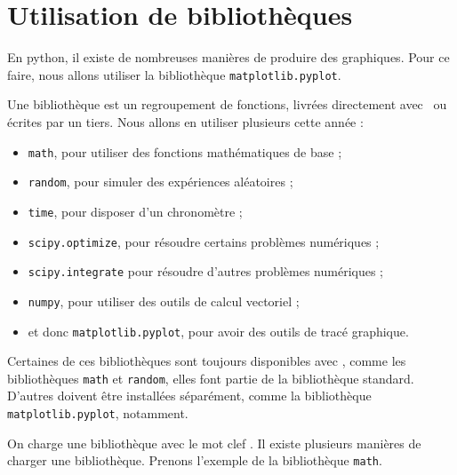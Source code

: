\section{Utilisation de bibliothèques}

En python, il existe de nombreuses manières de produire des graphiques. 
Pour ce faire, nous allons utiliser la bibliothèque \texttt{matplotlib.pyplot}. 

Une bibliothèque est un regroupement de fonctions, livrées directement avec \python\ ou écrites par un tiers.
Nous allons en utiliser plusieurs cette année : 
\begin{itemize}
  \item \texttt{math}, pour utiliser des fonctions mathématiques de base ; 
  \item \texttt{random}, pour simuler des expériences aléatoires ; 
  \item \texttt{time}, pour disposer d'un chronomètre ;
  \item \texttt{scipy.optimize}, pour résoudre certains problèmes numériques ; 
  \item \texttt{scipy.integrate} pour résoudre d'autres problèmes numériques ;
  \item \texttt{numpy}, pour utiliser des outils de calcul vectoriel ; 
  \item et donc \texttt{matplotlib.pyplot}, pour avoir des outils de tracé graphique. 
\end{itemize}
Certaines de ces bibliothèques sont toujours disponibles avec \python, comme les bibliothèques \texttt{math} et \texttt{random}, elles font partie de la bibliothèque standard. 
D'autres doivent être installées séparément, comme la bibliothèque \texttt{matplotlib.pyplot}, notamment. 

On charge une bibliothèque avec le mot clef . Il existe plusieurs manières de charger une bibliothèque. Prenons l'exemple de la bibliothèque \texttt{math}.

